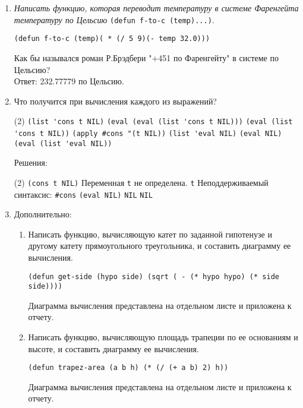 \begin{enumerate}[wide=0pt]
\begin{tasks}[label=\arabic*), item-indent=3pt, after-item-skip=1pt](2)
	\task Переменная \lstinline|ONE| не определена.
	\task Переменная \lstinline|ONE| не определена.
	\task Переменная \lstinline|FREE| не определена.
	\task Переменная \lstinline|ONE| не определена. 
\end{tasks}
\item \textit{Написать функцию, которая переводит температуру в системе Фаренгейта
температуру по Цельсию} \lstinline|(defun f-to-c (temp)...)|.
\begin{lstlisting}
(defun f-to-c (temp)( * (/ 5 9)(- temp 32.0)))
\end{lstlisting}
Как бы назывался роман Р.Брэдбери "+451 по Фаренгейту" в системе по Цельсию? \\
Ответ: 232.77779 по Цельсию.
\item Что получится при вычисления каждого из выражений?
\begin{tasks}[label=\arabic*), item-indent=3pt, after-item-skip=1pt](2)
	\task \lstinline|(list 'cons t NIL)|
	\task \lstinline|(eval (eval (list 'cons t NIL)))|
	\task \lstinline|(eval (list 'cons t NIL))|
	\task \lstinline|(apply #cons "(t NIL))|
	\task \lstinline|(list 'eval NIL)|
	\task \lstinline|(eval NIL)|
	\task \lstinline|(eval (list 'eval NIL))|
\end{tasks}
Решения:
\begin{tasks}[label=\arabic*), item-indent=3pt, after-item-skip=1pt](2)
	\task \lstinline|(cons t NIL)|
	\task Переменная \lstinline|t| не определена.
	\task \lstinline|t|
	\task Неподдерживаемый синтаксис: \lstinline|#cons|
	\task \lstinline|(eval NIL)|
	\task \lstinline|NIL|
	\task \lstinline|NIL|
\end{tasks}
\item Дополнительно:
\begin{enumerate}[wide=0pt]
	\item Написать функцию, вычисляющую катет по заданной гипотенузе и другому катету
	прямоугольного треугольника, и составить диаграмму ее вычисления. \\
	\begin{lstlisting}
(defun get-side (hypo side) (sqrt ( - (* hypo hypo) (* side side))))
	\end{lstlisting}
	Диаграмма вычисления представлена на отдельном листе и приложена к отчету.
	\item Написать функцию, вычисляющую площадь трапеции по ее основаниям и
	высоте, и составить диаграмму ее вычисления. \\
	\begin{lstlisting}
(defun trapez-area (a b h) (* (/ (+ a b) 2) h))
	\end{lstlisting}
	Диаграмма вычисления представлена на отдельном листе и приложена к отчету.
\end{enumerate}
\end{enumerate}

